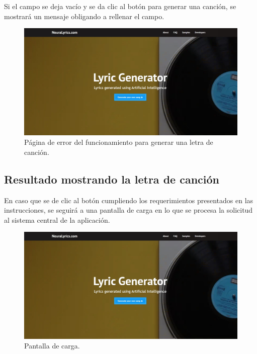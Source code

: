 \documentclass[12pt, a4paper, titlepage]{article}
\begin{document}
	Si el campo se deja vacío y se da clic al botón para generar una canción, se mostrará un mensaje obligando a rellenar el campo.
	
	\begin{figure}[H] 
		\includegraphics[width=13.5cm]{./Imagenes/Capturas/pprincipal.jpg}
		\centering \caption{Página de error del funcionamiento para generar una letra de canción.}
	\end{figure}
	\subsection{Resultado mostrando la letra de canción}
	En caso que se de clic al botón cumpliendo los requerimientos presentados en las instrucciones, se seguirá a una pantalla de carga en lo que se procesa la solicitud al sistema central de la aplicación.
	
	\begin{figure}[H] 
		\includegraphics[width=13.5cm]{./Imagenes/Capturas/pprincipal.jpg}
		\centering \caption{Pantalla de carga.}
	\end{figure}
	
\end{document}
